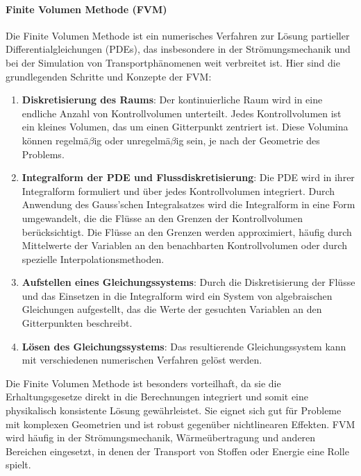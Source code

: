 \paragraph{Finite Volumen Methode (FVM)}

Die Finite Volumen Methode  ist ein numerisches Verfahren zur Lösung partieller Differentialgleichungen (PDEs), das insbesondere in der Strömungsmechanik und bei der Simulation von Transportphänomenen weit verbreitet ist. Hier sind die grundlegenden Schritte und Konzepte der FVM:

\begin{enumerate}
\item \textbf{Diskretisierung des Raums}: Der kontinuierliche Raum wird in eine endliche Anzahl von Kontrollvolumen unterteilt. Jedes Kontrollvolumen ist ein kleines Volumen, das um einen Gitterpunkt zentriert ist. Diese Volumina können regelmä$\beta$ig oder unregelmä$\beta$ig sein, je nach der Geometrie des Problems.
\item \textbf{Integralform der PDE und Flussdiskretisierung}: Die PDE wird in ihrer Integralform formuliert und über jedes Kontrollvolumen integriert. Durch Anwendung des Gauss'schen Integralsatzes wird die Integralform in eine Form umgewandelt, die die Flüsse an den Grenzen der Kontrollvolumen berücksichtigt. Die Flüsse an den Grenzen werden approximiert, häufig durch Mittelwerte der Variablen an den benachbarten Kontrollvolumen oder durch spezielle Interpolationsmethoden.
\item \textbf{Aufstellen eines Gleichungssystems}: Durch die Diskretisierung der Flüsse und das Einsetzen in die Integralform wird ein System von algebraischen Gleichungen aufgestellt, das die Werte der gesuchten Variablen an den Gitterpunkten beschreibt.
\item \textbf{Lösen des Gleichungssystems}: Das resultierende Gleichungssystem kann mit verschiedenen numerischen Verfahren gelöst werden.
\end{enumerate}

Die Finite Volumen Methode ist besonders vorteilhaft, da sie die Erhaltungsgesetze direkt in die Berechnungen integriert und somit eine physikalisch konsistente Lösung gewährleistet. Sie eignet sich gut für Probleme mit komplexen Geometrien und ist robust gegenüber nichtlinearen Effekten. FVM wird häufig in der Strömungsmechanik, Wärmeübertragung und anderen Bereichen eingesetzt, in denen der Transport von Stoffen oder Energie eine Rolle spielt.


